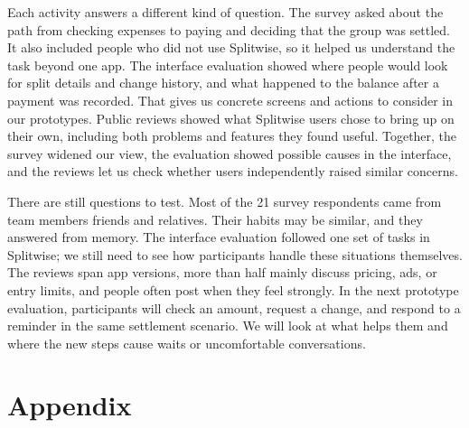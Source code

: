 \documentclass[letterpaper]{jdf}
\begin{document}
Each activity answers a different kind of question. The survey asked about the path from checking expenses to paying and deciding that the group was settled. It also included people who did not use Splitwise, so it helped us understand the task beyond one app. The interface evaluation showed where people would look for split details and change history, and what happened to the balance after a payment was recorded. That gives us concrete screens and actions to consider in our prototypes. Public reviews showed what Splitwise users chose to bring up on their own, including both problems and features they found useful. Together, the survey widened our view, the evaluation showed possible causes in the interface, and the reviews let us check whether users independently raised similar concerns.

There are still questions to test. Most of the 21 survey respondents came from team members\textquotesingle{} friends and relatives. Their habits may be similar, and they answered from memory. The interface evaluation followed one set of tasks in Splitwise; we still need to see how participants handle these situations themselves. The reviews span app versions, more than half mainly discuss pricing, ads, or entry limits, and people often post when they feel strongly. In the next prototype evaluation, participants will check an amount, request a change, and respond to a reminder in the same settlement scenario. We will look at what helps them and where the new steps cause waits or uncomfortable conversations.





\clearpage
\section{Appendix}\label{appendix}
\appendix



\end{document}
